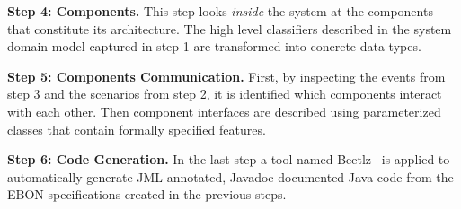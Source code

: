 \documentclass[conference]{IEEEtran}
\begin{document}
%
{\bf Step 4: Components.}
This step looks \emph{inside} the system at the components that constitute
its architecture. The high
level classifiers described in
the system domain model captured in step 1 are transformed into concrete
data types. 
%

%
{\bf Step 5: Components Communication.}
First, by inspecting the events from step 3 and the scenarios from step 2,
it is identified which components interact with each other. 
Then component interfaces are described using parameterized classes that 
contain formally specified features. 
%


%

%
{\bf Step 6: Code Generation.}
In the last step a tool named Beetlz~\cite{Darulova09} is applied to 
automatically generate JML-annotated, Javadoc documented Java code 
from the EBON specifications created in the previous steps. 
\end{document}
